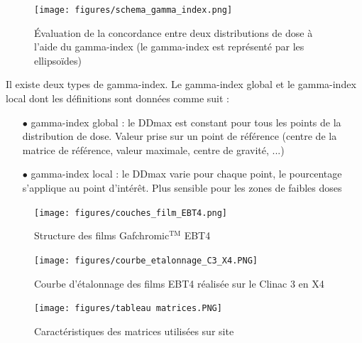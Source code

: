 \documentclass{book}
\begin{document}
\begin{figure}[h]
  \centering
  \texttt{[image: figures/schema\_gamma\_index.png]}
  \caption{Évaluation de la concordance entre deux distributions de dose à l'aide du gamma-index (le gamma-index est représenté par les ellipsoïdes)}
  \label{fig_gamma_index}
\end{figure}

Il existe deux types de gamma-index. Le gamma-index global et le gamma-index local dont les définitions sont données comme suit :

\begin{itemize}
  \item[$\bullet$] gamma-index global : le DDmax est constant pour tous les points de la distribution de dose. Valeur prise sur un point de référence (centre de la matrice de référence, valeur maximale, centre de gravité, ...)
  \item[$\bullet$] gamma-index local : le DDmax varie pour chaque point, le pourcentage s’applique au point d’intérêt. Plus sensible pour les zones de faibles doses
\end{itemize}

\newpage

\begin{figure}[h]
  \centering
  \texttt{[image: figures/couches\_film\_EBT4.png]}
  \caption{Structure des films Gafchromic$^{\text{TM}}$ EBT4 \cite{EBT4brochure}}
  \label{fig_couches_EBT4}
\end{figure}

\begin{figure}[h]
  \centering
  \texttt{[image: figures/courbe\_etalonnage\_C3\_X4.PNG]}
  \caption{Courbe d'étalonnage des films EBT4 réalisée sur le Clinac 3 en X4}
  \label{fig_courbe_etalonnage_X4}
\end{figure}

\begin{figure}[h]
  \centering
  \texttt{[image: figures/tableau matrices.PNG]}
  \caption{Caractéristiques des matrices utilisées sur site}
  \label{fig_matrices_centre}
\end{figure}

\clearpage


\nocite{*}
\end{document}
